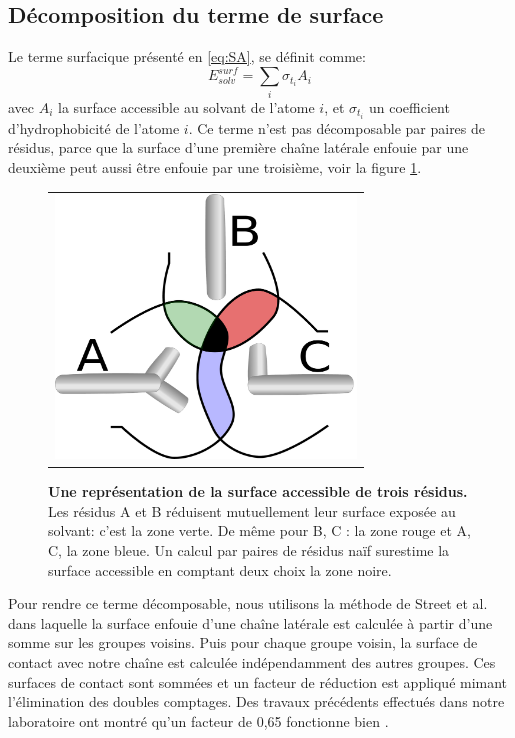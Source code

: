 \subsection{Décomposition du terme de surface}
\label{sub:surpairwise}

Le terme surfacique présenté en \vref{eq:SA}, se définit comme:
\begin{equation}
E_{solv}^{surf} = \sum_i \sigma_{t_i} A_i 
\end{equation}
avec $A_i$ la surface accessible au solvant de l'atome $i$, et $\sigma_{t_i}$ un coefficient d'hydrophobicité de l'atome $i$.
Ce terme n'est pas décomposable par paires de résidus, parce que la surface d'une première chaîne latérale enfouie par une deuxième peut aussi être enfouie par une troisième, voir la figure \ref{fig:intersurf}.

   \begin{figure}[!htbp]
     \centering
     \begin{tabular}{c}
       \includegraphics[width=8cm]{figure/intersurface.pdf} 
     \end{tabular}
     
     \caption{\textbf{Une représentation de la surface accessible de trois résidus.} Les résidus A et B réduisent mutuellement leur surface exposée au solvant: c'est la zone verte. De même pour B, C : la zone rouge et  A, C, la zone bleue. Un calcul par paires de résidus naïf surestime la surface accessible en comptant deux choix la zone noire. }
\label{fig:intersurf}
   \end{figure}


Pour rendre ce terme décomposable, nous utilisons la méthode de Street et al. \cite{Street98} dans laquelle la surface enfouie d'une chaîne latérale est calculée à partir d'une somme sur les groupes voisins. Puis pour chaque groupe voisin, la surface de contact avec notre chaîne est calculée indépendamment des autres groupes. Ces surfaces de contact sont sommées et un facteur de réduction est appliqué mimant l'élimination des doubles comptages. Des travaux précédents effectués dans notre laboratoire ont montré qu'un facteur de 0,65 fonctionne bien \cite{Lopes07,Gaillard14}.   


